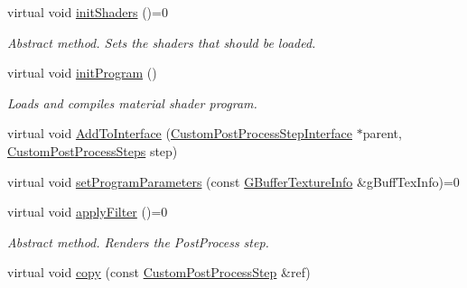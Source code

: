 \begin{DoxyCompactItemize}
\item 
\mbox{\label{class_geometry_engine_1_1_custom_shading_1_1_custom_post_process_step_ab6a2a3274de790dd6e6396d83f93e420}} 
virtual void \mbox{\hyperlink{class_geometry_engine_1_1_custom_shading_1_1_custom_post_process_step_ab6a2a3274de790dd6e6396d83f93e420}{init\+Shaders}} ()=0
\begin{DoxyCompactList}\small\item\em Abstract method. Sets the shaders that should be loaded. \end{DoxyCompactList}\item 
\mbox{\label{class_geometry_engine_1_1_custom_shading_1_1_custom_post_process_step_aca283ca9fd0a7d1ad65299da7c42c4f1}} 
virtual void \mbox{\hyperlink{class_geometry_engine_1_1_custom_shading_1_1_custom_post_process_step_aca283ca9fd0a7d1ad65299da7c42c4f1}{init\+Program}} ()
\begin{DoxyCompactList}\small\item\em Loads and compiles material shader program. \end{DoxyCompactList}\item 
virtual void \mbox{\hyperlink{class_geometry_engine_1_1_custom_shading_1_1_custom_post_process_step_a1b561f55754b9aec463b99763f25e57b}{Add\+To\+Interface}} (\mbox{\hyperlink{class_geometry_engine_1_1_custom_shading_1_1_custom_post_process_step_interface}{Custom\+Post\+Process\+Step\+Interface}} $\ast$parent, \mbox{\hyperlink{namespace_geometry_engine_1_1_custom_shading_a09e44ca81de5fe08c6d50271d680c4b1}{Custom\+Post\+Process\+Steps}} step)
\item 
virtual void \mbox{\hyperlink{class_geometry_engine_1_1_custom_shading_1_1_custom_post_process_step_ac52997f5ddea3cd39f3a71b4d1ab7683}{set\+Program\+Parameters}} (const \mbox{\hyperlink{class_geometry_engine_1_1_g_buffer_texture_info}{G\+Buffer\+Texture\+Info}} \&g\+Buff\+Tex\+Info)=0
\item 
\mbox{\label{class_geometry_engine_1_1_custom_shading_1_1_custom_post_process_step_a8155e60bafb03b3e655be961b76f546f}} 
virtual void \mbox{\hyperlink{class_geometry_engine_1_1_custom_shading_1_1_custom_post_process_step_a8155e60bafb03b3e655be961b76f546f}{apply\+Filter}} ()=0
\begin{DoxyCompactList}\small\item\em Abstract method. Renders the Post\+Process step. \end{DoxyCompactList}\item 
virtual void \mbox{\hyperlink{class_geometry_engine_1_1_custom_shading_1_1_custom_post_process_step_a81947f4d632eec5b5a2b438ba81c8a2d}{copy}} (const \mbox{\hyperlink{class_geometry_engine_1_1_custom_shading_1_1_custom_post_process_step}{Custom\+Post\+Process\+Step}} \&ref)
\end{DoxyCompactItemize}
